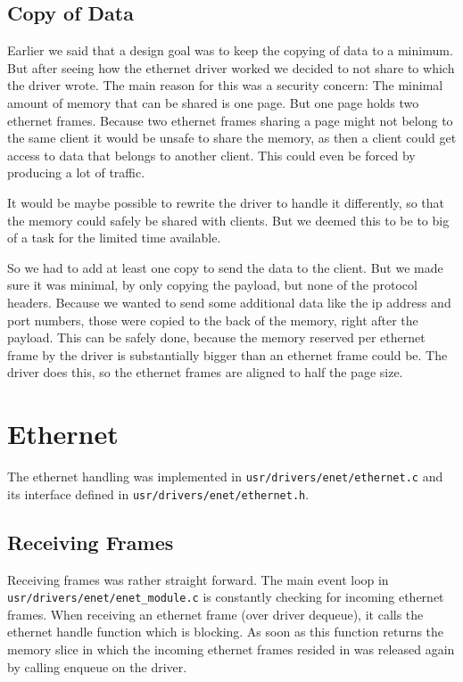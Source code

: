 \subsection{Copy of Data}
Earlier we said that a design goal was to keep the copying of data to a minimum. But after seeing how the ethernet driver worked we decided to not share to which the driver wrote. The main reason for this was a security concern: The minimal amount of memory that can be shared is one page. But one page holds two ethernet frames. Because two ethernet frames sharing a page might not belong to the same client it would be unsafe to share the memory, as then a client could get access to data that belongs to another client. This could even be forced by producing a lot of traffic.

It would be maybe possible to rewrite the driver to handle it differently, so that the memory could safely be shared with clients. But we deemed this to be to big of a task for the limited time available.

So we had to add at least one copy to send the data to the client. But we made sure it was minimal, by only copying the payload, but none of the protocol headers. Because we wanted to send some additional data like the ip address and port numbers, those were copied to the back of the memory, right after the payload. This can be safely done, because the memory reserved per ethernet frame by the driver is substantially bigger than an ethernet frame could be. The driver does this, so the ethernet frames are aligned to half the page size.

\section{Ethernet}
The ethernet handling was implemented in \verb|usr/drivers/enet/ethernet.c| and its interface defined in \verb|usr/drivers/enet/ethernet.h|.

\subsection{Receiving Frames}
Receiving frames was rather straight forward. The main event loop in \verb|usr/drivers/enet/enet_module.c| is constantly checking for incoming ethernet frames. When receiving an ethernet frame (over driver dequeue), it calls the ethernet handle function which is blocking. As soon as this function returns the memory slice in which the incoming ethernet frames resided in was released again by calling enqueue on the driver.

